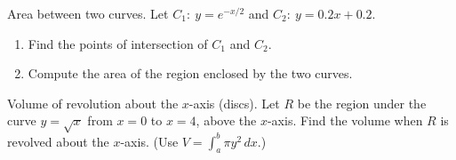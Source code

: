 \documentclass[11pt]{article}
\def\textbf#1{#1}%
\newcounter{question}
\begin{document}
\begin{question}
\textbf{Area between two curves.}
Let \(C_1:\ y=e^{-x/2}\) and \(C_2:\ y=0.2x+0.2\).
\begin{enumerate}
  \item Find the points of intersection of \(C_1\) and \(C_2\).
  \item Compute the area of the region enclosed by the two curves.
\end{enumerate}

\begin{center}
\end{center}
\end{question}

\begin{question}
\textbf{Volume of revolution about the \(x\)-axis (discs).}
Let \(R\) be the region under the curve \(y=\sqrt{x}\) from \(x=0\) to \(x=4\), above the \(x\)-axis.
Find the volume when \(R\) is revolved about the \(x\)-axis. (Use \(V=\displaystyle\int_a^b \pi y^2\,dx\).)

\begin{center}
\end{center}
\end{question}
\end{document}
